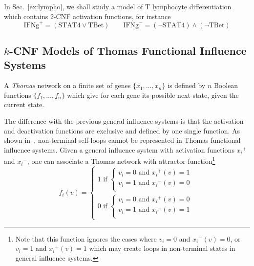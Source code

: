 \documentclass{llncs}
\begin{document}
\begin{example}
   In Sec.~\ref{ex:lympho}, we shall study a model of T lymphocyte differentiation which contains 2-CNF activation functions, for instance
   \[\text{IFNg}^+=(\text{STAT4}\vee \text{TBet})\qquad
   \text{IFNg}^-=(\neg \text{STAT4})\wedge(\neg \text{TBet})\]
\end{example}

\subsection{$k$-CNF Models of Thomas Functional Influence Systems}


\begin{definition}
   A \emph{Thomas} network on a finite set of genes $\{x_1,\dots,x_n\}$
   is defined by  $n$ Boolean functions $\{f_1,\dots,f_n\}$ which give for each gene its
   possible next state, given the current state.
\end{definition}

The difference with the previous general influence systems
is that the activation and deactivation functions are exclusive and defined by one single function.
As shown in~\cite{FMRS16cmsb}, non-terminal self-loops cannot be represented in Thomas functional influence systems.
Given a general influence system with activation functions ${x_i}^+$ and ${x_i}^-$, one can associate a Thomas network 
with attractor function\footnote{Note that this function ignores the cases where $v_i = 0$ and ${x_i}^-(v) =0$, or $v_i=1$ and ${x_i}^+(v)=1$
which may create loops in non-terminal states in general influence systems.}
\[
f_i(v) = \left\{\begin{array}{l}
1 \text{ if } \left\{\begin{array}{l}
v_i = 0 \text{ and } {x_i}^+(v) = 1\\
v_i = 1 \text{ and } {x_i}^-(v) = 0 \\
\end{array}\right.\\[1em]
0 \text{ if } \left\{\begin{array}{l}
v_i = 0 \text{ and } {x_i}^+(v) = 0\\
v_i = 1 \text{ and } {x_i}^-(v) = 1\\
\end{array}\right.
\end{array}\right.
\]
\end{document}
